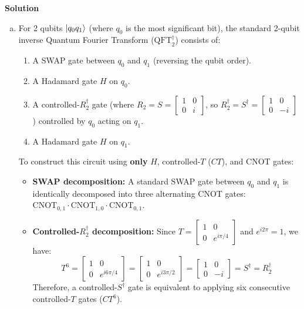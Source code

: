 \documentclass{article}
\newcommand{\solution}{\textbf{\large Solution}}
\begin{document}
\solution

\begin{enumerate}[(a)]
    \item For 2 qubits $\ket{q_0 q_1}$ (where $q_0$ is the most significant bit), the standard 2-qubit inverse Quantum Fourier Transform ($\text{QFT}_2^\dagger$) consists of:
    \begin{enumerate}
        \item A SWAP gate between $q_0$ and $q_1$ (reversing the qubit order).
        \item A Hadamard gate $H$ on $q_0$.
        \item A controlled-$R_2^\dagger$ gate (where $R_2 = S = \begin{bmatrix} 1 & 0 \\ 0 & i \end{bmatrix}$, so $R_2^\dagger = S^\dagger = \begin{bmatrix} 1 & 0 \\ 0 & -i \end{bmatrix}$) controlled by $q_0$ acting on $q_1$.
        \item A Hadamard gate $H$ on $q_1$.
    \end{enumerate}

    To construct this circuit using \textbf{only} $H$, controlled-$T$ ($CT$), and CNOT gates:
    \begin{itemize}
        \item \textbf{SWAP decomposition:} A standard SWAP gate between $q_0$ and $q_1$ is identically decomposed into three alternating CNOT gates: $\text{CNOT}_{0,1} \cdot \text{CNOT}_{1,0} \cdot \text{CNOT}_{0,1}$.
        \item \textbf{Controlled-$R_2^\dagger$ decomposition:} Since $T = \begin{bmatrix} 1 & 0 \\ 0 & e^{i\pi/4} \end{bmatrix}$ and $e^{i 2\pi} = 1$, we have:
        \[
        T^6 = \begin{bmatrix} 1 & 0 \\ 0 & e^{i 6\pi/4} \end{bmatrix} = \begin{bmatrix} 1 & 0 \\ 0 & e^{i 3\pi/2} \end{bmatrix} = \begin{bmatrix} 1 & 0 \\ 0 & -i \end{bmatrix} = S^\dagger = R_2^\dagger
        \]
        Therefore, a controlled-$S^\dagger$ gate is equivalent to applying six consecutive controlled-$T$ gates ($CT^6$).
    \end{itemize}


\end{enumerate}
\end{document}
